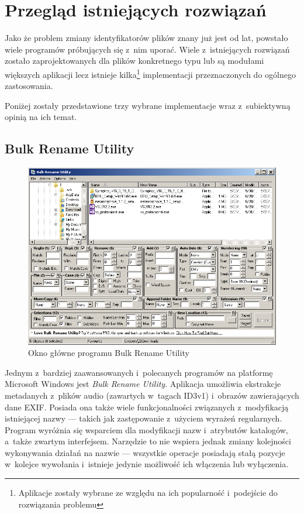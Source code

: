 \chapter{Przegląd istniejących rozwiązań}
\par
Jako że problem zmiany identyfikatorów plików znany już jest od lat, powstało wiele programów próbujących się z~nim uporać. Wiele z~istniejących rozwiązań zostało zaprojektowanych dla plików konkretnego typu lub są modułami większych aplikacji lecz istnieje kilka\footnote{Aplikacje zostały wybrane ze względu na ich popularność i~podejście do rozwiązania problemu} implementacji przeznaczonych do ogólnego zastosowania.
\par
Poniżej zostały przedstawione trzy wybrane implementacje wraz z~subiektywną opinią na ich temat.

\section{Bulk Rename Utility}
\begin{figure}[h]
\begin{center}
\includegraphics[scale=0.75]{img/bulkrename_window.png}
\end{center}
\caption{Okno główne programu Bulk Rename Utility}
\end{figure}

\par
Jednym z~bardziej zaawansowanych i~polecanych programów na platformę Microsoft Windows jest \textit{Bulk Rename Utility}. Aplikacja umożliwia ekstrakcje metadanych z~plików audio (zawartych w~tagach ID3v1) i~obrazów zawierających dane EXIF. Posiada ona także wiele funkcjonalności związanych z~modyfikacją istniejącej nazwy --- takich jak zastępowanie z~użyciem wyrażeń regularnych.
Program wyróżnia się wsparciem dla modyfikacji nazw i~atrybutów katalogów, a~także zwartym interfejsem.
Narzędzie to nie wspiera jednak zmiany kolejności wykonywania działań na nazwie --- wszystkie operacje posiadają stałą pozycje w~kolejce wywołania i~istnieje jedynie możliwość ich włączenia lub wyłączenia.\\

